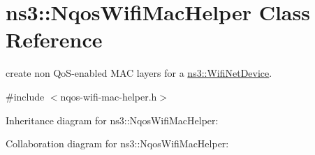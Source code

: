\hypertarget{classns3_1_1NqosWifiMacHelper}{}\section{ns3\+:\+:Nqos\+Wifi\+Mac\+Helper Class Reference}
\label{classns3_1_1NqosWifiMacHelper}


create non Qo\+S-\/enabled M\+AC layers for a \hyperlink{classns3_1_1WifiNetDevice}{ns3\+::\+Wifi\+Net\+Device}.  




{\ttfamily \#include $<$nqos-\/wifi-\/mac-\/helper.\+h$>$}



Inheritance diagram for ns3\+:\+:Nqos\+Wifi\+Mac\+Helper\+:


Collaboration diagram for ns3\+:\+:Nqos\+Wifi\+Mac\+Helper\+:
